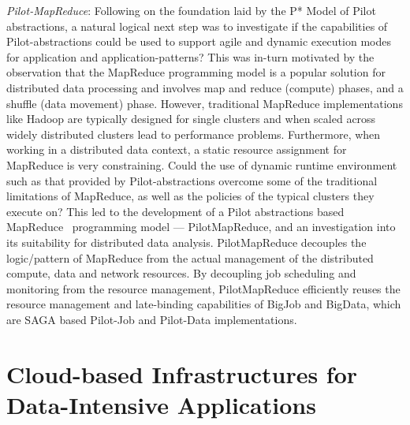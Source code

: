 \documentclass[times]{cpeauth}
\newcommand{\pilot}{Pilot\xspace}
\newcommand{\pilotmapreduce}{PilotMapReduce\xspace}
\begin{document}
{\it Pilot-MapReduce}: Following on the foundation laid by the P*
Model of Pilot abstractions, a natural logical next step was to
investigate if the capabilities of \pilot-abstractions could be used
to support agile and dynamic execution modes for application and
application-patterns?  This was in-turn motivated by the observation
that the MapReduce programming model is a popular solution for
distributed data processing and involves map and reduce (compute)
phases, and a shuffle (data movement) phase. However, traditional
MapReduce implementations like Hadoop are typically designed for
single clusters and when scaled across widely distributed clusters
lead to performance problems.  Furthermore, when working in a
distributed data context, a static resource assignment for MapReduce
is very constraining.  Could the use of dynamic runtime environment
such as that provided by \pilot-abstractions overcome some of the
traditional limitations of MapReduce, as well as the policies of the
typical clusters they execute on?  This led to the development of a
Pilot abstractions based
MapReduce~\cite{Mantha:2012:PEF:2287016.2287020} programming model ---
\pilotmapreduce, and an investigation into its suitability for
distributed data analysis.  \pilotmapreduce decouples the
logic/pattern of MapReduce from the actual management of the
distributed compute, data and network resources. By decoupling job
scheduling and monitoring from the resource management,
\pilotmapreduce efficiently reuses the resource management and
late-binding capabilities of BigJob and BigData, which are SAGA based
Pilot-Job and Pilot-Data implementations.


\section{Cloud-based Infrastructures for Data-Intensive Applications}
\end{document}
